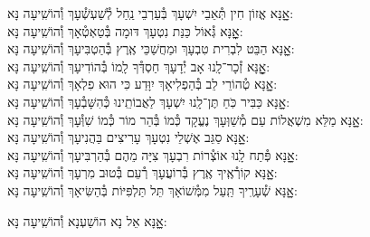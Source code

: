 \documentclass[twoside, openany, parskip=half, 11pt]{book}
\begin{document}
\begin{small}
אׇׇׇנָּא אֱזוֹן חִין תְּ֯אֵבֵי יִשְׁעָךְ בְּ֯עַרְבֵי נַֽחַל לְ֯שַׁעְשְׁ֯עָךְ \hfill וְ֯הוֹשִֽׁיעָה נָּא:\\
אׇׇׇׇׇׇנָּא גְּ֯אוֹל כַּנַּת נִטְעָךְ דּוּמָה בְּ֯טַאְטְ֯אָךְ \hfill וְ֯הוֹשִֽׁיעָה נָּא:\\
אׇׇׇנָּא הַבֵּט לִבְרִית טִבְעָךְ וּמַחֲשַׁכֵּי אֶֽרֶץ בְּ֯הַטְבִּיעָךְ \hfill וְ֯הוֹשִֽׁיעָה נָּא:\\
אׇׇׇׇׇׇנָּא זְ֯כָר־לָֽנוּ אָב יְ֯דָעָךְ חַסְדְּ֯ךָ לָֽמוֹ בְּ֯הוֹדִיעָךְ \hfill וְ֯הוֹשִֽׁיעָה נָּא:\\
אׇׇׇנָּא טְ֯הוֹרֵי לֵב בְּ֯הַפְלִיאָךְ יִוָּדַע כִּי הוּא פִלְאָךְ \hfill וְ֯הוֹשִֽׁיעָה נָּא:\\
אׇׇׇנָּא כַּבִּיר כֹּֽחַ תֶּן־לָֽנוּ יִשְׁעָךְ לַאֲבוֹתֵֽינוּ כְּ֯הִשָּׁבְ֯עָךְ \hfill וְ֯הוֹשִֽׁיעָה נָּא:\\
אׇׇׇנָּא מַלֵּא מִשְׁאֲלוֹת עַם מְ֯שַׁוְּעָךְ נֶעֱקָד כְּ֯מוֹ בְּ֯הַר מוֹר כְּ֯מוֹ שִׁוְּ֯עָךְ \hfill וְ֯הוֹשִֽׁיעָה נָּא:\\
אׇׇׇנָּא סַגֵּב אֶשְׁלֵי נִטְעָךְ עָרִיצִים בַּהֲנִיעָךְ \hfill וְ֯הוֹשִֽׁיעָה נָּא:\\
אׇׇׇנָּא פְּ֯תַח לָֽנוּ אוֹצְ֯רוֹת רִבְעָךְ צִיָּה מֵהֶם בְּ֯הַרְבִּיעָךְ \hfill וְ֯הוֹשִֽׁיעָה נָּא:\\
אׇׇׇנָּא קוֹרְ֯אֶֽיךָ אֶֽרֶץ בְּ֯רוֹעֲעָךְ רְ֯עֵם בְּ֯טוּב מִרְעָךְ \hfill וְ֯הוֹשִֽׁיעָה נָּא:\\
אׇׇׇנָּא שְׁ֯עָרֶֽיךָ תַּֽעַל מִמְּ֯שׁוֹאָךְ תֵּל תַּלְפִּיּוֹת בְּ֯הַשִּׂיאָךְ \hfill וְ֯הוֹשִֽׁיעָה נָּא:

\end{small}

\begin{large}
\shatzvkahal
אׇׇׇנָּא אֵל נָא הוֹשַׁעְנָא וְ֯הוֹשִֽׁיעָה נָּא:

\end{large}
\end{document}
